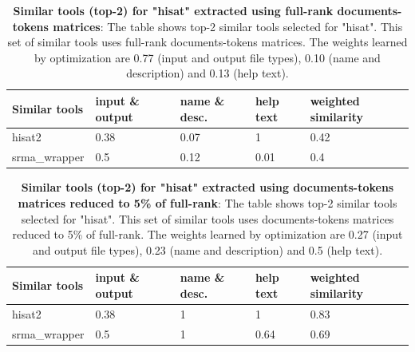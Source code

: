 \begin{table}[ht]
\begin{center}
    \begin{tabular}{|l|l|l|l|l|}
        \hline
        Similar tools & input \& output & name \& desc. & help text & weighted similarity \\ \hline
        hisat2   & 0.38 & 0.07 & 1 & 0.42  \\ \hline
        srma\_wrapper & 0.5 & 0.12 & 0.01 & 0.4 \\ \hline
    \end{tabular}
    \end{center}
    \caption[Similar tools (top-2) for "hisat" extracted using full-rank documents-tokens matrices]{\textbf{Similar tools (top-2) for "hisat" extracted using full-rank documents-tokens matrices}: The table shows top-2 similar tools selected for "hisat". This set of similar tools uses full-rank documents-tokens matrices. The weights learned by optimization are 0.77 (input and output file types), 0.10 (name and description) and 0.13 (help text).}
    \label{tab:accuracy}
\end{table}

\begin{table}[ht]
\begin{center}
    \begin{tabular}{|l|l|l|l|l|}
        \hline
        Similar tools   & input \& output & name \& desc. & help text & weighted similarity \\ \hline
        hisat2   & 0.38 & 1 & 1 & 0.83 \\ \hline
        srma\_wrapper & 0.5 & 1 & 0.64 & 0.69 \\ \hline
    \end{tabular}
    \end{center}
    \caption[Similar tools (top-2) for "hisat" extracted using documents-tokens matrices reduced to 5\% of full-rank]{\textbf{Similar tools (top-2) for "hisat" extracted using documents-tokens matrices reduced to 5\% of full-rank}: The table shows top-2 similar tools selected for "hisat". This set of similar tools uses documents-tokens matrices reduced to 5\% of full-rank. The weights learned by optimization are 0.27 (input and output file types), 0.23 (name and description) and 0.5 (help text).}
    \label{tab:accuracy}
\end{table}


